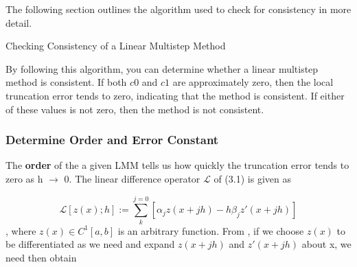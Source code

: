 The following section outlines the algorithm used to check for consistency in more detail.


\begin{algorithm}
   \caption{Checking Consistency of a Linear Multistep Method}
   \begin{algorithmic}[1] %
       
   
   
   
   
   \end{algorithmic}
   \end{algorithm}


By following this algorithm, you can determine whether a linear multistep method is consistent. If both $c0$ and $c1$ are approximately zero, then the local truncation error tends to zero, indicating that the method is consistent. If either of these values is not zero, then the method is not consistent.

\subsubsection{Determine Order and Error Constant}

The \textbf{order} of the a given LMM tells us how quickly the truncation error tends to zero as h $\to$ 0. The linear difference operator $\mathcal{L}$ of (3.1) is given as

\begin{equation}
   \mathcal{L}[z(x);h] := \sum_{k}^{j=0}[\alpha_jz(x+jh)-h\beta_jz'(x+jh)]
\end{equation}, where $z(x) \in C^1[a,b]$ is an arbitrary function. From \cite{lambert1977}, if we choose $z(x)$ to be differentiated as we need and expand $z(x+jh)$ and $z'(x+jh)$ about x, we need then obtain 

